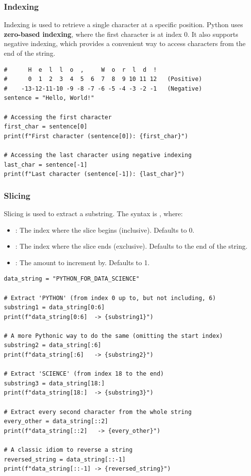 \subsubsection*{Indexing}
Indexing is used to retrieve a single character at a specific position. Python uses \textbf{zero-based indexing}, where the first character is at index 0. It also supports negative indexing, which provides a convenient way to access characters from the end of the string.

\text{ }\begin{verbatim}
#      H  e  l  l  o  ,     W  o  r  l  d  !
#      0  1  2  3  4  5  6  7  8  9 10 11 12   (Positive)
#    -13-12-11-10 -9 -8 -7 -6 -5 -4 -3 -2 -1   (Negative)
sentence = "Hello, World!"

# Accessing the first character
first_char = sentence[0]
print(f"First character (sentence[0]): {first_char}")

# Accessing the last character using negative indexing
last_char = sentence[-1]
print(f"Last character (sentence[-1]): {last_char}")
\end{verbatim}

\subsubsection*{Slicing}
Slicing is used to extract a substring. The syntax is , where:
\begin{itemize}
    \item {}: The index where the slice begins (inclusive). Defaults to 0.
    \item {}: The index where the slice ends (exclusive). Defaults to the end of the string.
    \item {}: The amount to increment by. Defaults to 1.
\end{itemize}

\begin{example}\text{ }
\text{ }\begin{verbatim}
data_string = "PYTHON_FOR_DATA_SCIENCE"

# Extract 'PYTHON' (from index 0 up to, but not including, 6)
substring1 = data_string[0:6]
print(f"data_string[0:6]  -> {substring1}")

# A more Pythonic way to do the same (omitting the start index)
substring2 = data_string[:6]
print(f"data_string[:6]   -> {substring2}")

# Extract 'SCIENCE' (from index 18 to the end)
substring3 = data_string[18:]
print(f"data_string[18:]  -> {substring3}")

# Extract every second character from the whole string
every_other = data_string[::2]
print(f"data_string[::2]   -> {every_other}")

# A classic idiom to reverse a string
reversed_string = data_string[::-1]
print(f"data_string[::-1] -> {reversed_string}")
\end{verbatim}
\end{example}

